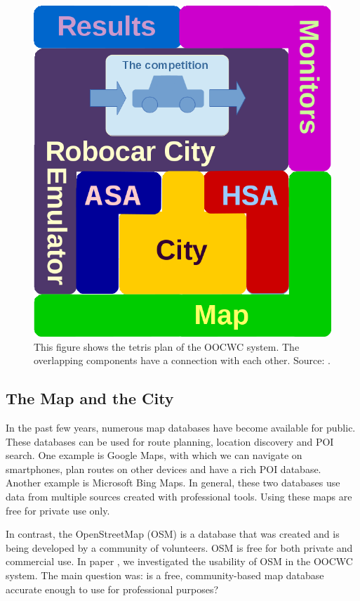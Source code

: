 \documentclass[b5paper,12pt]{report}
\theoremstyle{definition}
\begin{document}
\begin{figure}[ht]
\centering
\includegraphics[scale=.3]{img/tetris_plan.png}
\caption{This figure shows the tetris plan of the OOCWC system. The overlapping components have a connection with each other. Source: \cite{infocomjournal}.}
\label{tetris_plan}
\end{figure}

\subsection{The Map and the City}
\label{map}

In the past few years, numerous map databases have become available for public. These databases can be used for route planning, location discovery and POI search. One example is Google Maps, with which we can navigate on smartphones, plan routes on other devices and have a rich POI database. Another example is Microsoft Bing Maps. In general, these two databases use data from multiple sources created with professional tools. Using these maps are free for private use only.

In contrast, the OpenStreetMap (OSM) is a database that was created and is being developed by a community of volunteers. OSM is free for both private and commercial use. In paper \cite{openmapsimul}, we investigated the usability of OSM in the OOCWC system. The main question was: is a free, community-based map database accurate enough to use for professional purposes?
\end{document}
